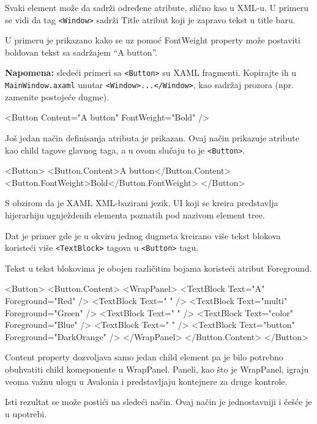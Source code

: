 \documentclass[11pt,a4paper]{article}
\begin{document}
Svaki element može da sadrži određene atribute, slično kao u XML-u. U primeru se vidi da tag \texttt{<Window>} sadrži Title atribut koji je zapravo tekst u title baru.

U primeru je prikazano kako se uz pomoć FontWeight property može postaviti boldovan tekst sa sadržajem “A button”.

\textbf{Napomena:} sledeći primeri sa \texttt{<Button>} su XAML fragmenti. Kopirajte ih u \texttt{MainWindow.axaml} unutar \texttt{<Window>...</Window>}, kao sadržaj prozora (npr. zamenite postojeće dugme).

\begin{CodeBlock}
<Button Content="A button" FontWeight="Bold" />
\end{CodeBlock}

Još jedan način definisanja atributa je prikazan. Ovaj način prikazuje atribute kao child tagove glavnog taga, a u ovom slučaju to je \texttt{<Button>}.

\begin{CodeBlock}
<Button>
  <Button.Content>A button</Button.Content>
  <Button.FontWeight>Bold</Button.FontWeight>
</Button>
\end{CodeBlock}

S obzirom da je XAML XML-bazirani jezik, UI koji se kreira predstavlja hijerarhiju ugnježdenih elementa poznatih pod nazivom element tree.

Dat je primer gde je u okviru jednog dugmeta kreirano više tekst blokova koristeći više \texttt{<TextBlock>} tagova u \texttt{<Button>} tagu.

Tekst u tekst blokovima je obojen različitim bojama koristeći atribut Foreground.

\begin{CodeBlock}
<Button>
  <Button.Content>
    <WrapPanel>
      <TextBlock Text="A" Foreground="Red" />
      <TextBlock Text=" " />
      <TextBlock Text="multi" Foreground="Green" />
      <TextBlock Text=" " />
      <TextBlock Text="color" Foreground="Blue" />
      <TextBlock Text=" " />
      <TextBlock Text="button" Foreground="DarkOrange" />
    </WrapPanel>
  </Button.Content>
</Button>
\end{CodeBlock}

Content property dozvoljava samo jedan child element pa je bilo potrebno obuhvatiti child komeponente u WrapPanel. Paneli, kao što je WrapPanel, igraju veoma važnu ulogu u Avalonia i predstavljaju kontejnere za druge kontrole.

Isti rezultat se može postići na sledeći način. Ovaj način je jednostavniji i češće je u upotrebi.
\end{document}
